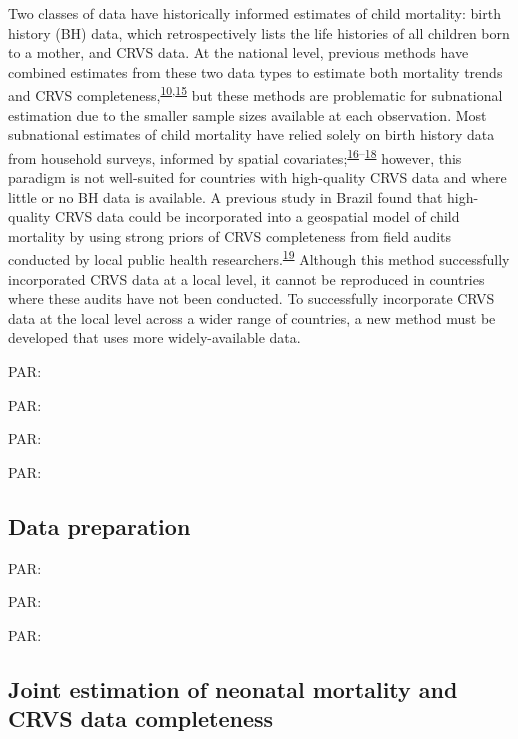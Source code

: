 \documentclass[
]{article}
\begin{document}
Two classes of data have historically informed estimates of child mortality: birth history (BH) data, which retrospectively lists the life histories of all children born to a mother, and CRVS data. At the national level, previous methods have combined estimates from these two data types to estimate both mortality trends and CRVS completeness,\textsuperscript{\protect\hyperlink{ref-Dicker2018}{10},\protect\hyperlink{ref-Fisker2019}{15}} but these methods are problematic for subnational estimation due to the smaller sample sizes available at each observation. Most subnational estimates of child mortality have relied solely on birth history data from household surveys, informed by spatial covariates;\textsuperscript{\protect\hyperlink{ref-Golding2017}{16}--\protect\hyperlink{ref-Wakefield2019}{18}} however, this paradigm is not well-suited for countries with high-quality CRVS data and where little or no BH data is available. A previous study in Brazil found that high-quality CRVS data could be incorporated into a geospatial model of child mortality by using strong priors of CRVS completeness from field audits conducted by local public health researchers.\textsuperscript{\protect\hyperlink{ref-Schmertmann2018}{19}} Although this method successfully incorporated CRVS data at a local level, it cannot be reproduced in countries where these audits have not been conducted. To successfully incorporate CRVS data at the local level across a wider range of countries, a new method must be developed that uses more widely-available data.

PAR:

PAR:

PAR:

PAR:

\hypertarget{data-preparation}{%
\subsection{Data preparation}\label{data-preparation}}

PAR:

PAR:

PAR:

\hypertarget{joint-estimation-of-neonatal-mortality-and-crvs-data-completeness}{%
\subsection{Joint estimation of neonatal mortality and CRVS data completeness}\label{joint-estimation-of-neonatal-mortality-and-crvs-data-completeness}}
\end{document}

